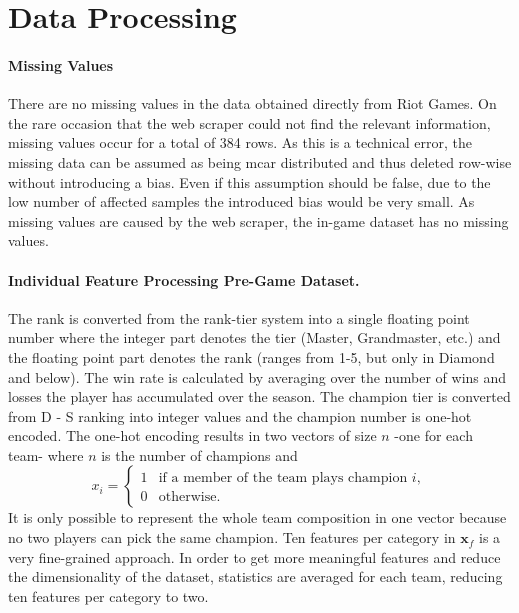 \documentclass[12pt, a4paper, headinclude, twoside, plainheadsepline, open=right, numbers=noenddot, hidelinks, toc=listof, toc=bibliography]{scrreprt}
\begin{document}
\section{Data Processing}
\label{sec:data_processing}

\paragraph{Missing Values}
There are no missing values in the data obtained directly from Riot Games.
On the rare occasion that the web scraper could not find the relevant information, missing values occur for a total of 384 rows.
As this is a technical error, the missing data can be assumed as being \ac{mcar} distributed \cite{acockWorkingMissingValues2005} and thus deleted row-wise without introducing a bias.
Even if this assumption should be false, due to the low number of affected samples the introduced bias would be very small.
As missing values are caused by the web scraper, the in-game dataset has no missing values.

\paragraph{Individual Feature Processing Pre-Game Dataset.}
The rank is converted from the rank-tier system into a single floating point number where the integer part denotes the tier (Master, Grandmaster, etc.) and the floating point part denotes the rank (ranges from 1-5, but only in Diamond and below).
The win rate is calculated by averaging over the number of wins and losses the player has accumulated over the season.
The champion tier is converted from D - S ranking into integer values and the champion number is one-hot encoded.
The one-hot encoding results in two vectors of size $n$ -one for each team- where $n$ is the number of champions and 
\begin{equation*}
x_i = 
\begin{cases}
	1 & \text{if a member of the team plays champion } i, \\
	0 & \text{otherwise}.
\end{cases}
\end{equation*}
It is only possible to represent the whole team composition in one vector because no two players can pick the same champion.
Ten features per category in $\mathbf{x}_f$ is a very fine-grained approach.
In order to get more meaningful features and reduce the dimensionality of the dataset, statistics are averaged for each team, reducing ten features per category to two.
\end{document}
